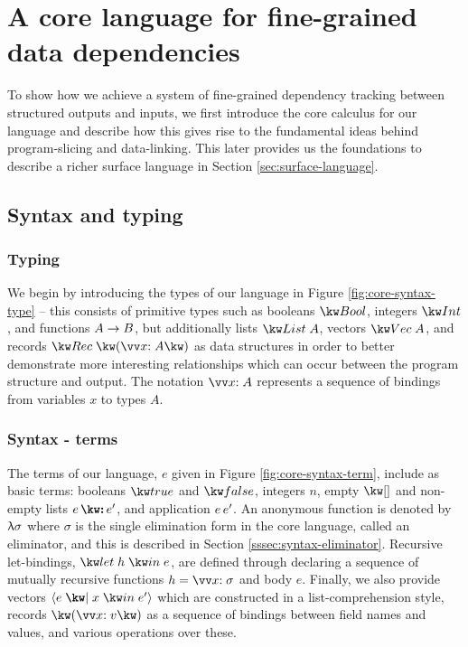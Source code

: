 \newpage

\section{A core language for fine-grained data dependencies}
\label{sec:core-language}

To show how we achieve a system of fine-grained dependency tracking between structured outputs and inputs, we first introduce the core calculus for our language and describe how this gives rise to the fundamental ideas behind program-slicing and data-linking. This later provides us the foundations to describe a richer surface language in Section \ref{sec:surface-language}.

\subsection{Syntax and typing}

\subsubsection{Typing}
We begin by introducing the types of our language in Figure \ref{fig:core-syntax-type} -- this consists of primitive types such as booleans $\tyBool$, integers $\tyInt$, and functions ${A}\rightarrow{B}$, but additionally lists $\tyList{A}$, vectors $\tyVec{A}$, and records $\tyRec{\vec{\bind{x}{A}}}$ as data structures in order to better demonstrate more interesting relationships which can occur between the program structure and output. The notation $\seq{\bind{x}{A}}$  represents a sequence of bindings from variables $x$ to types $A$.



\subsubsection{Syntax - terms}
The terms of our language, $e$ given in Figure \ref{fig:core-syntax-term}, include as basic terms: booleans $\exTrue$ and $\exFalse$, integers $n$, empty $\exNil$ and non-empty lists $\exCons{e}{e'}$, and application ${e}\,{e'}$. An anonymous function is denoted by $\uplambda{\sigma}$ where $\sigma$ is the single elimination form in the core language, called an eliminator, and this is described in Section \ref{sssec:syntax-eliminator}. Recursive let-bindings, $\exLetRecMutual{h}{e}$, are defined through declaring a sequence of mutually recursive functions $h = \seq{\bind{x}{\sigma}}$ and body $e$. Finally, we also provide vectors $\exVec{e}{x}{e'}$ which are constructed in a list-comprehension style, records $\exRec{\vec{\bind{x}{v}}}$ as a sequence of bindings between field names and values, and various operations over these. 


